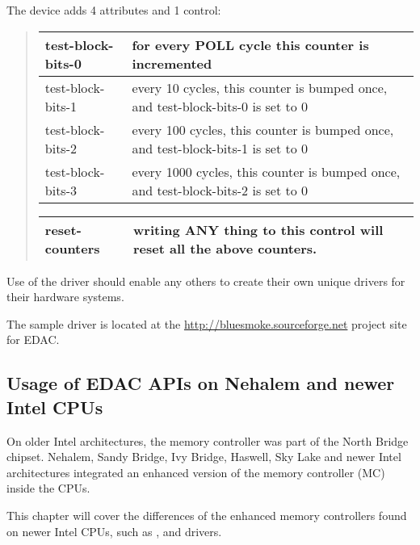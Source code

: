 \documentclass[a4paper,8pt,english]{sphinxmanual}
\begin{document}
The  device adds 4 attributes and 1 control:
\begin{quote}

\begin{tabulary}{\linewidth}{|L|L|}
\hline

test-block-bits-0
 & 
for every POLL cycle this counter
is incremented
\\
\hline
test-block-bits-1
 & 
every 10 cycles, this counter is bumped once,
and test-block-bits-0 is set to 0
\\
\hline
test-block-bits-2
 & 
every 100 cycles, this counter is bumped once,
and test-block-bits-1 is set to 0
\\
\hline
test-block-bits-3
 & 
every 1000 cycles, this counter is bumped once,
and test-block-bits-2 is set to 0
\\
\hline\end{tabulary}


\begin{tabulary}{\linewidth}{|L|L|}
\hline

reset-counters
 & 
writing ANY thing to this control will
reset all the above counters.
\\
\hline\end{tabulary}

\end{quote}

Use of the  driver should enable any others to create their own
unique drivers for their hardware systems.

The  sample driver is located at the
\href{http://bluesmoke.sourceforge.net}{http://bluesmoke.sourceforge.net} project site for EDAC.


\subsection{Usage of EDAC APIs on Nehalem and newer Intel CPUs}
\label{admin-guide/ras:usage-of-edac-apis-on-nehalem-and-newer-intel-cpus}
On older Intel architectures, the memory controller was part of the North
Bridge chipset. Nehalem, Sandy Bridge, Ivy Bridge, Haswell, Sky Lake and
newer Intel architectures integrated an enhanced version of the memory
controller (MC) inside the CPUs.

This chapter will cover the differences of the enhanced memory controllers
found on newer Intel CPUs, such as ,  and
 drivers.
\end{document}
